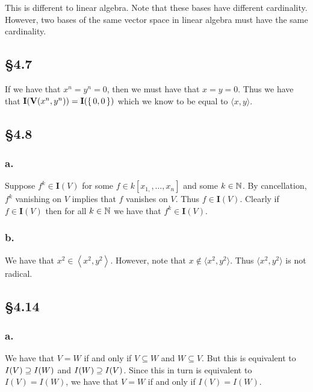 \documentclass[letterpaper]{article}
\begin{document}
This is different to linear algebra.
Note that these bases have different cardinality.
However, two bases of the same vector space in linear algebra must have the same cardinality.

\subsection*{\S 4.7}

If we have that $x^{n} = y^{n} = 0$, then we must have that $x = y = 0$.
Thus we have that $\mathbf{I}\pqty{\textbf{V}\pqty{x^{n}, y^{n}}} = \mathbf{I}(\set{0, 0})$ which we know to be equal to $\langle x, y \rangle$.

\subsection*{\S 4.8}

\subsubsection*{a.}
Suppose $f^{k} \in \mathbf{I}(V)$ for some $f \in k[x_{1,}, \ldots, x_{n}]$ and some $k \in \mathbb{N}$.
By cancellation, $f^{k}$ vanishing on $V$ implies that $f$ vanishes on $V$.
Thus $f \in \mathbf{I}(V)$.
Clearly if $f \in \mathbf{I}(V)$ then for all $k \in \mathbb{N}$ we have that $f^{k} \in \mathbf{I}(V)$.

\subsubsection*{b.}

We have that $x^{2} \in \left\langle x^{2}, y^{2} \right\rangle$.
However, note that $x \notin \langle x^{2}, y^{2} \rangle$.
Thus $\langle x^{2}, y^{2} \rangle$ is not radical.

\subsection*{\S 4.14}

\subsubsection*{a.}

We have that $V = W$ if and only if $V \subseteq W$ and $W \subseteq V$.
But this is equivalent to $I(V) \supseteq I(W)$ and $I(W) \supseteq I(V)$.
Since this in turn is equivalent to $I(V) = I(W)$, we have that $V = W$ if and only if $I(V) = I(W)$.
\end{document}
